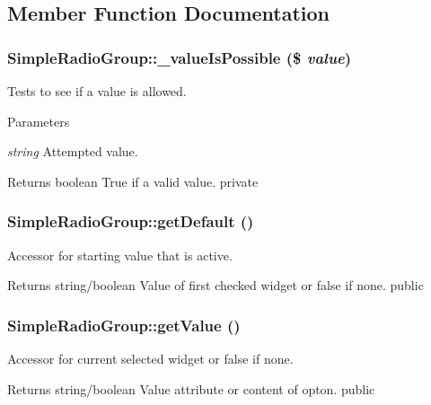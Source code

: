 \subsection{Member Function Documentation}
\hypertarget{class_simple_radio_group_a810f7be694c8ebec2b72308d062fb567}{
\subsubsection[{\_\-valueIsPossible}]{\setlength{\rightskip}{0pt plus 5cm}SimpleRadioGroup::\_\-valueIsPossible (\$ {\em value})}}
\label{class_simple_radio_group_a810f7be694c8ebec2b72308d062fb567}
Tests to see if a value is allowed. 
\begin{DoxyParams}{Parameters}
\item[{\em string}]Attempted value. \end{DoxyParams}
\begin{DoxyReturn}{Returns}
boolean True if a valid value.  private 
\end{DoxyReturn}
\hypertarget{class_simple_radio_group_a2cf7703fd1d0a439a63fff94f18ea5c8}{
\subsubsection[{getDefault}]{\setlength{\rightskip}{0pt plus 5cm}SimpleRadioGroup::getDefault ()}}
\label{class_simple_radio_group_a2cf7703fd1d0a439a63fff94f18ea5c8}
Accessor for starting value that is active. \begin{DoxyReturn}{Returns}
string/boolean Value of first checked widget or false if none.  public 
\end{DoxyReturn}
\hypertarget{class_simple_radio_group_a4fe55d05e9df72bc09ef03b05532520e}{
\subsubsection[{getValue}]{\setlength{\rightskip}{0pt plus 5cm}SimpleRadioGroup::getValue ()}}
\label{class_simple_radio_group_a4fe55d05e9df72bc09ef03b05532520e}
Accessor for current selected widget or false if none. \begin{DoxyReturn}{Returns}
string/boolean Value attribute or content of opton.  public 
\end{DoxyReturn}
